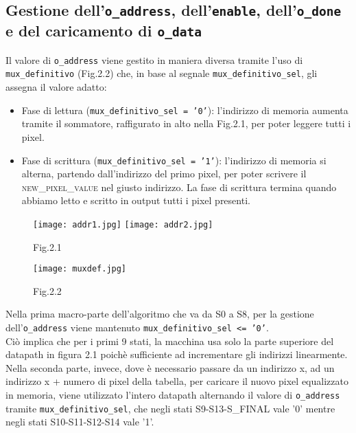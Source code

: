 \documentclass[12pt, table, xcdraw]{article}
\begin{document}
\subsection{Gestione dell'\texttt{o\_address}, dell'\texttt{enable}, dell'\texttt{o\_done} e del caricamento di \texttt{o\_data}}
Il valore di \texttt{o\_address} viene gestito in maniera diversa tramite l'uso di \texttt{mux\_definitivo} (Fig.2.2) che, in base al segnale \texttt{mux\_definitivo\_sel}, gli assegna il valore adatto: 
\begin{itemize}
\item Fase di lettura (\texttt{mux\_definitivo\_sel = '0'}): l'indirizzo di memoria aumenta tramite il sommatore, raffigurato in alto nella Fig.2.1, per poter leggere tutti i pixel.
\item Fase di scrittura (\texttt{mux\_definitivo\_sel = '1'}): l'indirizzo di memoria si alterna, partendo dall'indirizzo del primo pixel, per poter scrivere il \textsc{new\_pixel\_value} nel giusto indirizzo. La fase di scrittura termina quando abbiamo letto e scritto in output tutti i pixel presenti.
\end{itemize}


\begin{figure}[h!]
\centering
  \texttt{[image: addr1.jpg]}
   \texttt{[image: addr2.jpg]}
	\caption*{Fig.2.1}
\end{figure}
\begin{figure}[h!]
  \texttt{[image: muxdef.jpg]}
\caption*{Fig.2.2}
\end{figure}
\FloatBarrier



\newpage
Nella prima macro-parte dell'algoritmo che va da S0 a S8, per la gestione dell'\texttt{o\_address} viene mantenuto \texttt{mux\_definitivo\_sel <= '0'}. \\Ciò implica che per i primi 9 stati, la macchina usa solo la parte superiore del datapath in figura 2.1 poichè sufficiente ad incrementare gli indirizzi linearmente.\\ Nella seconda parte, invece, dove è necessario passare da un indirizzo x, ad un indirizzo x + numero di pixel della tabella, per caricare il nuovo pixel equalizzato in memoria, viene utilizzato l'intero datapath alternando il valore di \texttt{o\_address} tramite \texttt{mux\_definitivo\_sel}, che negli stati S9-S13-S\_FINAL vale '0' mentre negli stati S10-S11-S12-S14 vale '1'.
\end{document}
